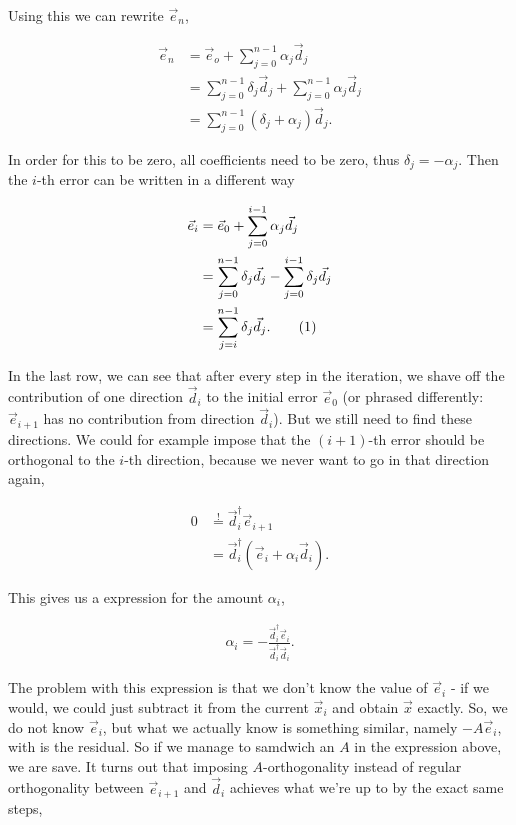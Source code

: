 \documentclass{article}
\newcommand\numberthis{\addtocounter{equation}{1}\tag{\theequation}}
\theoremstyle{plain} %
\theoremstyle{remark} %
\numberwithin{equation}{section}
\begin{document}
Using this we can rewrite $\vec{e}_n$,

\begin{align*}
    \vec{e}_{n} &= \vec{e}_o + \sum_{j=0}^{n-1} \alpha_j \vec{d}_j \\
                &= \sum_{j=0}^{n-1} \delta_j \vec{d}_j + \sum_{j=0}^{n-1} \alpha_j \vec{d}_j \\
                &= \sum_{j=0}^{n-1} (\delta_j + \alpha_j) \vec{d}_j.
\end{align*}

In order for this to be zero, all coefficients need to be zero, thus $\delta_j = - \alpha_j$. Then the $i$-th error can be written in a different way

\begin{align*}
    \vec{e}_{i} &= \vec{e}_0 + \sum_{j=0}^{i-1} \alpha_j \vec{d}_j \\
                &= \sum_{j=0}^{n-1} \delta_j \vec{d}_j - \sum_{j=0}^{i-1} \delta_j \vec{d}_j \\
                &= \sum_{j=i}^{n-1} \delta_j \vec{d}_j. \numberthis \label{eq:error_i}
\end{align*}

In the last row, we can see that after every step in the iteration, we shave off the contribution of one direction $\vec{d}_i$ to the initial error $\vec{e}_0$ (or phrased differently: $\vec{e}_{i+1}$ has no contribution from direction $\vec{d}_i$). But we still need to find these directions. We could for example impose that the $(i+1)$-th error should be orthogonal to the $i$-th direction, because we never want to go in that direction again,

\begin{align*}
    0 &\stackrel{!}{=} \vec{d}_i^{\dagger} \vec{e}_{i+1} \\
                    &= \vec{d}_i^{\dagger} ( \vec{e}_{i} + \alpha_i \vec{d}_i ).
\end{align*}

This gives us a expression for the amount $\alpha_i$,

\begin{align*}
    \alpha_i = - \frac{ \vec{d}_i^{\dagger} \vec{e}_{i} }{ \vec{d}_i^{\dagger} \vec{d}_i }.
\end{align*}

The problem with this expression is that we don't know the value of $\vec{e}_i$ - if we would, we could just subtract it from the current $\vec{x}_i$ and obtain $\vec{x}$ exactly. So, we do not know $\vec{e}_i$, but what we actually know is something similar, namely $-A \vec{e}_i$, with is the residual. So if we manage to samdwich an $A$ in the expression above, we are save. It turns out that imposing $A$-orthogonality instead of regular orthogonality between $\vec{e}_{i+1}$ and $\vec{d}_i$ achieves what we're up to by the exact same steps,
\end{document}
